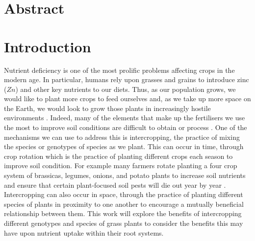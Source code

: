 \documentclass[11pt]{article}
\numberwithin{equation}{section}
\begin{document}
\newpage
\section*{Abstract}
\newpage
\doublespacing
\tableofcontents

\singlespacing
\newpage
{}
\setcounter{page}{1}




\section{Introduction}

Nutrient deficiency is one of the most prolific problems affecting crops in the modern age. In particular, humans rely upon grasses and grains to introduce zinc ($Zn$) and other key nutrients to our diets. Thus, as our population grows, we would like to plant more crops to feed ourselves and, as we take up more space on the Earth, we would look to grow those plants in increasingly hostile environments \cite{calicioglu_2019}. Indeed,  many of the elements that make up the fertilisers we use the most to improve soil conditions are difficult to obtain or process \cite{fact.mr_2021}. One of the mechanisms we can use to address this is intercropping, the practice of mixing the species or genotypes of species as we plant. This can occur in time, through crop rotation which is the practice of planting different crops each season to improve soil condition. For example many farmers rotate planting a four crop system of brassicas, legumes, onions, and potato plants to increase soil nutrients and ensure that certain plant-focused soil pests will die out year by year \cite{xuan_2011}. Intercropping can also occur in space, through the practice of planting different species of plants in proximity to one another to encourage a mutually beneficial relationship between them. This work will explore the benefits of intercropping different genotypes and species of grass plants to consider the benefits this may have upon nutrient uptake within their root systems.
\end{document}
